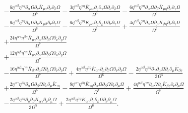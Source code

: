 \documentclass[10pt,letterpaper]{article}
\begin{document}
\begin{align}
&-  \frac{6 \eta^{\alpha \beta} \eta^{\gamma \eta} \partial_{\alpha}\Omega \partial_{\eta}\bar{K}_{\mu \gamma} \partial_{\nu}\partial_{\beta}\Omega}{\Omega^6} -  \frac{3 \eta^{\alpha \beta} \eta^{\gamma \eta} \bar{K}_{\mu \alpha} \partial_{\eta}\partial_{\gamma}\Omega \partial_{\nu}\partial_{\beta}\Omega}{\Omega^6} -  \frac{6 \eta^{\alpha \beta} \eta^{\gamma \eta} \partial_{\alpha}\Omega \partial_{\beta}\bar{K}_{\mu \eta} \partial_{\nu}\partial_{\gamma}\Omega}{\Omega^6} \nonumber \\
&-  \frac{6 \eta^{\alpha \beta} \eta^{\gamma \eta} \partial_{\alpha}\Omega \partial_{\eta}\bar{K}_{\mu \beta} \partial_{\nu}\partial_{\gamma}\Omega}{\Omega^6} -  \frac{6 \eta^{\alpha \beta} \eta^{\gamma \eta} \bar{K}_{\mu \alpha} \partial_{\eta}\partial_{\beta}\Omega \partial_{\nu}\partial_{\gamma}\Omega}{\Omega^6} + \frac{4 \eta^{\alpha \beta} \eta^{\gamma \eta} \partial_{\alpha}\Omega \partial_{\mu}\bar{K}_{\beta \eta} \partial_{\nu}\partial_{\gamma}\Omega}{\Omega^6} \nonumber \\
&+ \frac{24 \eta^{\alpha \gamma} \eta^{\beta \eta} \bar{K}_{\mu \gamma} \partial_{\alpha}\Omega \partial_{\beta}\Omega \partial_{\nu}\partial_{\eta}\Omega}{\Omega^7} \nonumber \\
&+ \frac{12 \eta^{\alpha \beta} \eta^{\gamma \eta} \bar{K}_{\mu \gamma} \partial_{\alpha}\Omega \partial_{\beta}\Omega \partial_{\nu}\partial_{\eta}\Omega}{\Omega^7}\nonumber \\
& -  \frac{16 \eta^{\alpha \beta} \eta^{\gamma \eta} \bar{K}_{\beta \gamma} \partial_{\alpha}\Omega \partial_{\mu}\Omega \partial_{\nu}\partial_{\eta}\Omega}{\Omega^7} + \frac{4 \eta^{\alpha \beta} \eta^{\gamma \eta} \bar{K}_{\alpha \gamma} \partial_{\mu}\partial_{\beta}\Omega \partial_{\nu}\partial_{\eta}\Omega}{\Omega^6} -  \frac{2 \eta^{\alpha \beta} \eta^{\gamma \eta} \partial_{\gamma}\partial_{\alpha}\Omega \partial_{\nu}\partial_{\mu}\bar{K}_{\beta \eta}}{3 \Omega^5} \nonumber \\
&+ \frac{2 \eta^{\alpha \gamma} \eta^{\beta \eta} \partial_{\alpha}\Omega \partial_{\beta}\Omega \partial_{\nu}\partial_{\mu}\bar{K}_{\gamma \eta}}{\Omega^6} -  \frac{8 \eta^{\alpha \gamma} \eta^{\beta \eta} \bar{K}_{\gamma \eta} \partial_{\alpha}\Omega \partial_{\beta}\Omega \partial_{\nu}\partial_{\mu}\Omega}{\Omega^7} + \frac{4 \eta^{\alpha \beta} \eta^{\gamma \eta} \partial_{\alpha}\Omega \partial_{\eta}\bar{K}_{\beta \gamma} \partial_{\nu}\partial_{\mu}\Omega}{\Omega^6} \nonumber \\
&-  \frac{2 \eta^{\alpha \beta} \eta^{\gamma \eta} \partial_{\eta}\partial_{\beta}\bar{K}_{\alpha \gamma} \partial_{\nu}\partial_{\mu}\Omega}{3 \Omega^5} + \frac{2 \eta^{\alpha \beta} \eta^{\gamma \eta} \bar{K}_{\alpha \gamma} \partial_{\eta}\partial_{\beta}\Omega \partial_{\nu}\partial_{\mu}\Omega}{\Omega^6}  .
\end{align}
\end{document}
